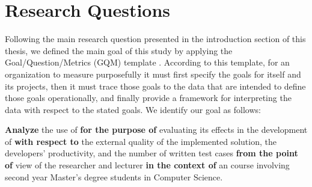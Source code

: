 \section{Research Questions}
Following the main research question presented in the introduction section of this thesis, we defined the main goal of this study by applying the Goal/Question/Metrics (GQM) template \cite{GQM}.
According to this template, for an organization to measure purposefully it must first specify the goals for itself and its projects, then it must trace those goals to the data that are intended to define those goals operationally, and finally provide a framework for interpreting the data with respect to the stated goals.
We identify our goal as follows:

\begin{framed}
\noindent
\textbf{Analyze} the use of \tdd 
\textbf{for the purpose of} evaluating its effects in the development of \ess
\textbf{with respect to} the external quality of the implemented solution, the developers' productivity, and the number of written test cases
\textbf{from the point of} view of the researcher and lecturer 
\textbf{in the context of} an \ess course involving second year Master's degree students in Computer Science.
\end{framed}


